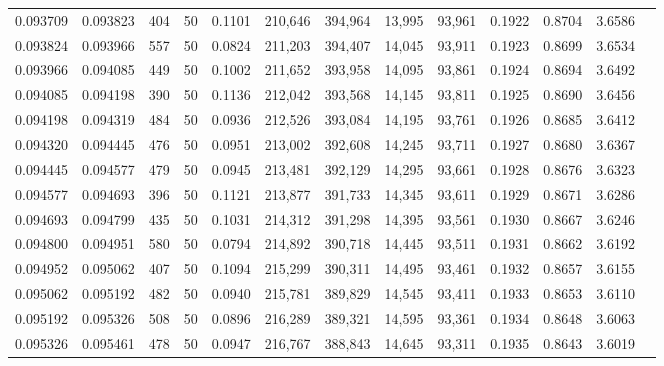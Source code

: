 \begin{tabular}{rrrrrrrrrrrrr}
0.093709 & 0.093823 &   404 &  50 &                                     0.1101 & 210,646 & 394,964 &  13,995 &  93,961 & 0.1922 & 0.8704 & 3.6586 \\
0.093824 & 0.093966 &   557 &  50 &                                     0.0824 & 211,203 & 394,407 &  14,045 &  93,911 & 0.1923 & 0.8699 & 3.6534 \\
0.093966 & 0.094085 &   449 &  50 &                                     0.1002 & 211,652 & 393,958 &  14,095 &  93,861 & 0.1924 & 0.8694 & 3.6492 \\
0.094085 & 0.094198 &   390 &  50 &                                     0.1136 & 212,042 & 393,568 &  14,145 &  93,811 & 0.1925 & 0.8690 & 3.6456 \\
0.094198 & 0.094319 &   484 &  50 &                                     0.0936 & 212,526 & 393,084 &  14,195 &  93,761 & 0.1926 & 0.8685 & 3.6412 \\
0.094320 & 0.094445 &   476 &  50 &                                     0.0951 & 213,002 & 392,608 &  14,245 &  93,711 & 0.1927 & 0.8680 & 3.6367 \\
0.094445 & 0.094577 &   479 &  50 &                                     0.0945 & 213,481 & 392,129 &  14,295 &  93,661 & 0.1928 & 0.8676 & 3.6323 \\
0.094577 & 0.094693 &   396 &  50 &                                     0.1121 & 213,877 & 391,733 &  14,345 &  93,611 & 0.1929 & 0.8671 & 3.6286 \\
0.094693 & 0.094799 &   435 &  50 &                                     0.1031 & 214,312 & 391,298 &  14,395 &  93,561 & 0.1930 & 0.8667 & 3.6246 \\
0.094800 & 0.094951 &   580 &  50 &                                     0.0794 & 214,892 & 390,718 &  14,445 &  93,511 & 0.1931 & 0.8662 & 3.6192 \\
0.094952 & 0.095062 &   407 &  50 &                                     0.1094 & 215,299 & 390,311 &  14,495 &  93,461 & 0.1932 & 0.8657 & 3.6155 \\
0.095062 & 0.095192 &   482 &  50 &                                     0.0940 & 215,781 & 389,829 &  14,545 &  93,411 & 0.1933 & 0.8653 & 3.6110 \\
0.095192 & 0.095326 &   508 &  50 &                                     0.0896 & 216,289 & 389,321 &  14,595 &  93,361 & 0.1934 & 0.8648 & 3.6063 \\
0.095326 & 0.095461 &   478 &  50 &                                     0.0947 & 216,767 & 388,843 &  14,645 &  93,311 & 0.1935 & 0.8643 & 3.6019 \\

\end{tabular}
